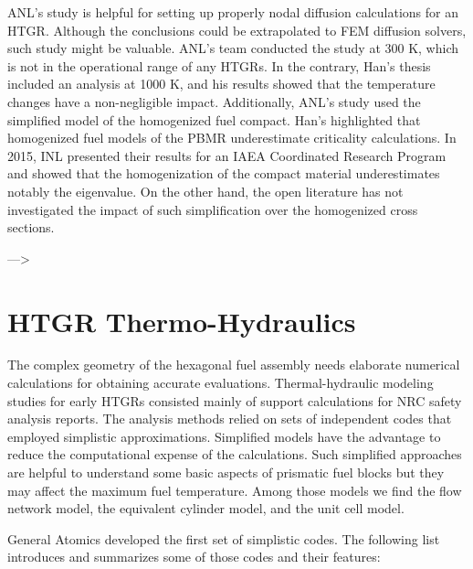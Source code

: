 \documentclass[11pt,letterpaper]{article}
\begin{document}
ANL's study is helpful for setting up properly nodal diffusion calculations for an \gls{HTGR}.
Although the conclusions could be extrapolated to \gls{FEM} diffusion solvers, such study might be valuable.
ANL's team conducted the study at 300 K, which is not in the operational range of any \glspl{HTGR}.
In the contrary, Han's thesis included an analysis at 1000 K, and his results showed that the temperature changes have a non-negligible impact.
Additionally, ANL's study used the simplified model of the homogenized fuel compact.
Han's highlighted that homogenized fuel models of the \gls{PBMR} underestimate criticality calculations.
In 2015, \gls{INL} presented their results for an \gls{IAEA} Coordinated Research Program and showed that the homogenization of the compact material underestimates notably the eigenvalue.
On the other hand, the open literature has not investigated the impact of such simplification over the homogenized cross sections.



--->



\section{HTGR Thermo-Hydraulics}

The complex geometry of the hexagonal fuel assembly needs elaborate numerical calculations for obtaining accurate evaluations.
Thermal-hydraulic modeling studies for early \glspl{HTGR} consisted mainly of support calculations for NRC safety analysis reports.
The analysis methods relied on sets of independent codes that employed simplistic approximations.
Simplified models have the advantage to reduce the computational expense of the calculations.
Such simplified approaches are helpful to understand some basic aspects of prismatic fuel blocks but they may affect the maximum fuel temperature.
Among those models we find the flow network model, the equivalent cylinder model, and the unit cell model.

General Atomics \cite{shenoy_htgr_1974} developed the first set of simplistic codes.
The following list introduces and summarizes some of those codes and their features:
\end{document}
